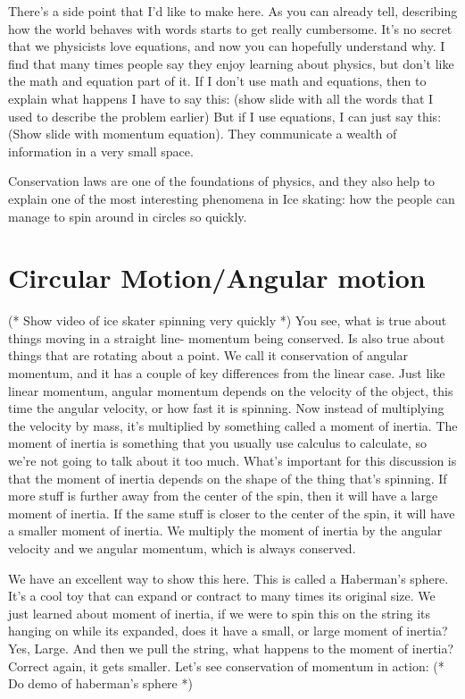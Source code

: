 \documentclass[12pt]{article}
\begin{document}
There's a side point that I'd like to make here.
As you can already tell, describing how the world behaves with words starts to get 
really cumbersome. It's no secret that we physicists love equations, and now you
can hopefully understand why. I find that many times people say they enjoy learning
about physics, but don't like the math and equation part of it. If I don't use
math and equations, then to explain what happens I have to say this:
(show slide with all the words that I used to 
describe the problem earlier)
But if I use equations, I can just say this:
(Show slide with momentum equation). 
They communicate a wealth of information in a very 
small space. 

Conservation laws are one of the foundations of physics, and they also help to explain
one of the most interesting phenomena in Ice skating: how the people can manage to 
spin around in circles so quickly. 

\section{Circular Motion/Angular motion}
(* Show video of ice skater spinning very quickly *)
You see, what is true about things moving in a straight line- momentum being conserved. Is also 
true about things that are rotating about a point. We call it conservation of angular momentum,
and it has a couple of key differences from the linear case. Just like linear momentum, 
angular momentum depends on the velocity of the object, this time the angular velocity,
or how fast it is spinning. Now instead of multiplying the velocity by mass, it's
multiplied by something called a moment of inertia. The moment of inertia is something
that you usually use calculus to calculate, so we're not going to talk about it too much.
What's important for this discussion is that the moment of inertia depends on the shape
of the thing that's spinning. If more stuff is further away from the center of the spin, 
then it will have a large moment of inertia. If the same stuff is closer to the center
of the spin, it will have a smaller moment of inertia. We multiply the moment of inertia
by the angular velocity and we angular momentum, which is always conserved. 

We have an excellent way to show
this here. This is called a Haberman's sphere. It's a cool toy that can expand or contract
to many times its original size. We just learned about moment of inertia, if we were to spin 
this on the string its hanging on while its expanded, does it have a small, or large moment
of inertia? Yes, Large. And then we pull the string, what happens to the moment of inertia? 
Correct again, it gets smaller. Let's see conservation of momentum in action: 
(* Do demo of haberman's sphere *)
\end{document}
